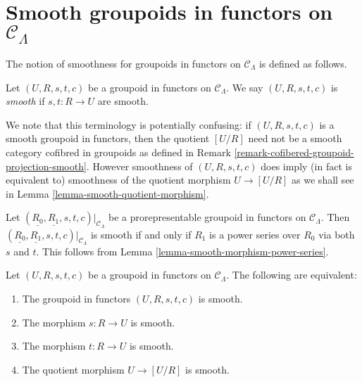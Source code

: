 \section{Smooth groupoids in functors on $\mathcal{C}_\Lambda$}
\label{section-smooth-minimal-groupoids-in-functors}

\noindent
The notion of smoothness for groupoids in functors on $\mathcal{C}_\Lambda$ is
defined as follows.

\begin{definition}
\label{definition-smooth-groupoid-in-functors}
Let $(U, R, s, t, c)$ be a groupoid in functors on $\mathcal{C}_\Lambda$. We
say $(U, R, s, t, c)$ is {\it smooth} if $s, t: R \to U$ are smooth.
\end{definition}

\begin{remark}
\label{remark-smooth-groupoid-in-functors-warning}
We note that this terminology is potentially confusing:
if $(U, R, s, t, c)$ is a smooth groupoid in functors, then the quotient
$[U/R]$ need not be a smooth category cofibred in groupoids as defined in
Remark \ref{remark-cofibered-groupoid-projection-smooth}.
However smoothness of $(U, R, s, t, c)$ does imply (in fact is equivalent to)
smoothness of the quotient morphism $U \to [U/R]$ as we shall
see in
Lemma \ref{lemma-smooth-quotient-morphism}.
\end{remark}

\begin{remark}
\label{remark-smooth-power-series-prorepresentable-smooth-groupoid-in-functors}
Let $(\underline{R_0}, \underline{R_1}, s, t, c)|_{\mathcal{C}_\Lambda}$
be a prorepresentable groupoid in functors on $\mathcal{C}_\Lambda$.
Then $(\underline{R_0}, \underline{R_1}, s, t, c)|_{\mathcal{C}_\Lambda}$
is smooth if and only if $R_1$ is a power series over $R_0$ via both $s$
and $t$. This follows from
Lemma \ref{lemma-smooth-morphism-power-series}.
\end{remark}

\begin{lemma}
\label{lemma-smooth-quotient-morphism}
Let $(U, R, s, t, c)$ be a groupoid in functors on $\mathcal{C}_\Lambda$.
The following are equivalent:
\begin{enumerate}
\item The groupoid in functors $(U, R, s, t, c)$ is smooth.
\item The morphism $s : R \to U$ is smooth.
\item The morphism $t : R \to U$ is smooth.
\item The quotient morphism $U \to [U/R]$ is smooth.
\end{enumerate}
\end{lemma}

